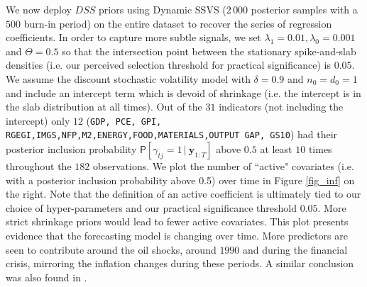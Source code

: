 \documentclass[ba]{imsart}
\numberwithin{equation}{section}
\theoremstyle{plain}
\newcommand{\bm}[1]{\boldsymbol{#1}}
\renewcommand{\P}{\mathsf{P}}
\def\C {\,|\:}
\def\C {\,|\:}
\begin{document}
{We now deploy $DSS$ priors using Dynamic SSVS ($2\,000$ posterior samples with a $500$ burn-in period) on the entire dataset to recover the series of regression coefficients. 
In order to capture   more subtle signals, we set $\lambda_1=0.01,\lambda_0=0.001$ and $\Theta=0.5$ so that the intersection point between the stationary spike-and-slab densities (i.e. our perceived selection threshold for practical significance) is $0.05$. We assume the discount stochastic volatility model with $\delta=0.9$ and $n_0=d_0=1$ and include an intercept term which is devoid of shrinkage (i.e. the intercept is  in the slab distribution at all times).
Out of the $31$ indicators (not including the intercept) only $12$ (\texttt{GDP, PCE, GPI, RGEGI,IMGS,NFP,M2,ENERGY,FOOD,MATERIALS,OUTPUT GAP, GS10}) had their posterior inclusion probability $\P[\gamma_{tj}=1\C \bm y_{1:T}]$ above $0.5$ at least $10$ times throughout the $182$ observations. We plot the number of ``active" covariates (i.e. with a posterior inclusion probability above 0.5) over time in Figure \ref{fig_inf} on the right. 
Note that the definition of an active coefficient is  ultimately tied to our choice of hyper-parameters and our practical significance threshold $0.05$.   More strict shrinkage priors would lead to fewer active covariates.
This plot presents evidence that the forecasting model is changing over time. More predictors are seen to contribute around the oil shocks, around   $1990$ and during the financial crisis, mirroring the inflation changes  during these periods.
A similar conclusion was also found in \cite{KoopKorobilis2012}.

}
\end{document}
